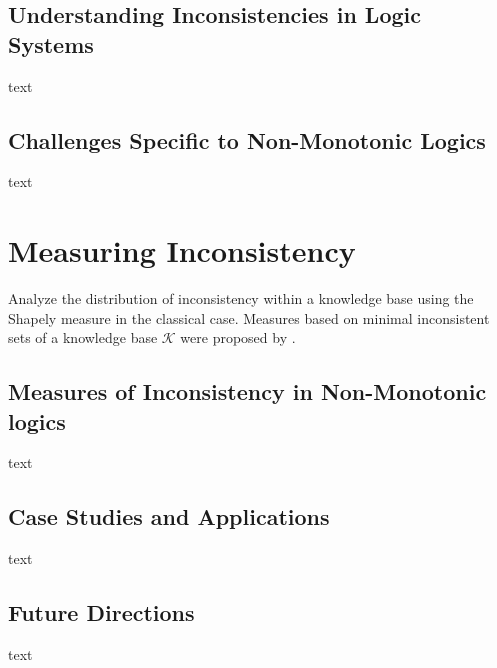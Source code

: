 \subsection{Understanding Inconsistencies in Logic Systems}
text

\subsection{Challenges Specific to Non-Monotonic Logics}
text

\section{Measuring Inconsistency}
Analyze the distribution of inconsistency within a knowledge base using the Shapely measure \cite{hunter_measure_2010} in the classical case.
Measures based on minimal inconsistent sets of a knowledge base \(\mathcal{K}\) \cite{jabbour_mis_2016} were proposed by \cite{ulbricht_measuring_2018}.

\subsection{Measures of Inconsistency in Non-Monotonic logics}
text

\subsection{Case Studies and Applications}
text

\subsection{Future Directions}
text
